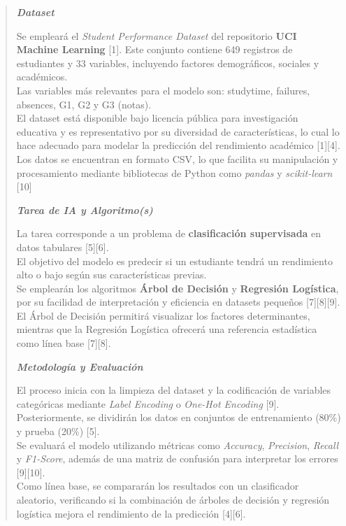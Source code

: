 \documentclass[
]{article}
\begin{document}
\begin{quote}
\emph{\textbf{Dataset}}

Se empleará el \emph{Student Performance Dataset} del repositorio
\textbf{UCI Machine Learning} {[}1{]}. Este conjunto contiene 649
registros de estudiantes y 33 variables, incluyendo factores
demográficos, sociales y académicos.\\
Las variables más relevantes para el modelo son: studytime, failures,
absences, G1, G2 y G3 (notas).\\
El dataset está disponible bajo licencia pública para investigación
educativa y es representativo por su diversidad de características, lo
cual lo hace adecuado para modelar la predicción del rendimiento
académico {[}1{]}{[}4{]}.\\
Los datos se encuentran en formato CSV, lo que facilita su manipulación
y procesamiento mediante bibliotecas de Python como \emph{pandas} y
\emph{scikit-learn} {[}10{]}

\emph{\textbf{Tarea de IA y Algoritmo(s)}}

La tarea corresponde a un problema de \textbf{clasificación supervisada}
en datos tabulares {[}5{]}{[}6{]}.\\
El objetivo del modelo es predecir si un estudiante tendrá un
rendimiento alto o bajo según sus características previas.\\
Se emplearán los algoritmos \textbf{Árbol de Decisión} y
\textbf{Regresión Logística}, por su facilidad de interpretación y
eficiencia en datasets pequeños {[}7{]}{[}8{]}{[}9{]}.\\
El Árbol de Decisión permitirá visualizar los factores determinantes,
mientras que la Regresión Logística ofrecerá una referencia estadística
como línea base {[}7{]}{[}8{]}.

\emph{\textbf{Metodología y Evaluación}}

El proceso inicia con la limpieza del dataset y la codificación de
variables categóricas mediante \emph{Label Encoding} o \emph{One-Hot
Encoding} {[}9{]}.\\
Posteriormente, se dividirán los datos en conjuntos de entrenamiento
(80\%) y prueba (20\%) {[}5{]}.\\
Se evaluará el modelo utilizando métricas como \emph{Accuracy},
\emph{Precision}, \emph{Recall} y \emph{F1-Score}, además de una matriz
de confusión para interpretar los errores {[}9{]}{[}10{]}.\\
Como línea base, se compararán los resultados con un clasificador
aleatorio, verificando si la combinación de árboles de decisión y
regresión logística mejora el rendimiento de la predicción
{[}4{]}{[}6{]}.


\end{quote}
\end{document}
